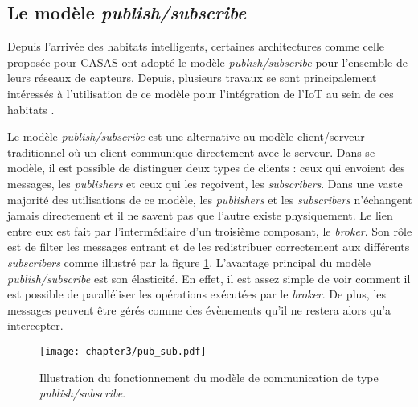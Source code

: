 \subsection{Le modèle \textit{publish/subscribe}}

Depuis l'arrivée des habitats intelligents, certaines architectures comme celle proposée pour CASAS \citep{Cook2013} ont adopté le modèle \textit{publish/subscribe} pour l'ensemble de leurs réseaux de capteurs. Depuis, plusieurs travaux se sont principalement intéressés à l'utilisation de ce modèle pour l'intégration de l'\acs{IoT} au sein de ces habitats \citep{Lee2014, Upadhyay2016, VandenBossche2018}.

Le modèle \textit{publish/subscribe} est une alternative au modèle client/serveur traditionnel où un client communique directement avec le serveur. Dans se modèle, il est possible de distinguer deux types de clients : ceux qui envoient des messages, les \textit{publishers} et ceux qui les reçoivent, les \textit{subscribers}. Dans une vaste majorité des utilisations de ce modèle, les \textit{publishers} et les \textit{subscribers} n'échangent jamais directement et il ne savent pas que l'autre existe physiquement. Le lien entre eux est fait par l'intermédiaire d'un troisième composant, le \textit{broker}. Son rôle est de filter les messages entrant et de les redistribuer correctement aux différents \textit{subscribers} comme illustré par la figure \ref{fig:pub_sub}. L'avantage principal du modèle \textit{publish/subscribe} est son élasticité. En effet, il est assez simple de voir comment il est possible de paralléliser les opérations exécutées par le \textit{broker}. De plus, les messages peuvent être gérés comme des évènements qu'il ne restera alors qu'a intercepter.

\begin{figure}[H]
	\centering
	\texttt{[image: chapter3/pub\_sub.pdf]}
        \caption{Illustration du fonctionnement du modèle de communication de type \textit{publish/subscribe}.}
	\label{fig:pub_sub}
\end{figure}

